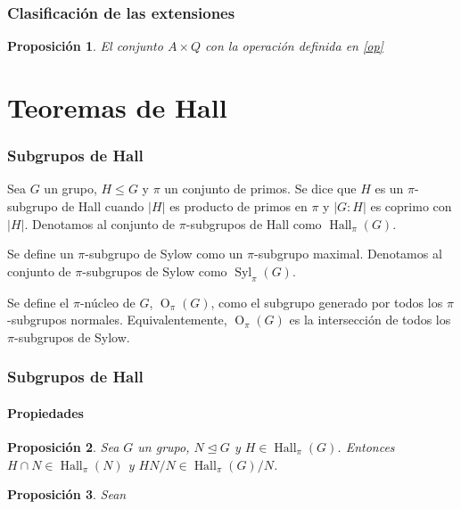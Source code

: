 \documentclass[
	11pt, %
]{beamer}
\DeclareMathOperator{\SylowSubgroup}{Syl}
\DeclareMathOperator{\HallSubgroup}{Hall}
\DeclareMathOperator{\OSubgroup}{O}
\newcommand{\Syl}[2]{\SylowSubgroup_{#1}(#2)}
\newcommand{\Hall}[2]{\HallSubgroup_{#1}(#2)}
\newcommand{\Core}[2]{\OSubgroup_{#1}(#2)}
\newcommand{\norm}{\trianglelefteq}
\newcommand{\ord}[1]{\left|#1\right|}%
\newtheorem{proposition}{Proposici\'on}
\begin{document}
\begin{frame}
	\frametitle{Clasificación de las extensiones}
	\begin{proposition}
		El conjunto $A\times Q$ con la operación definida en \eqref{op}
	\end{proposition}
	
	
\end{frame}



\section{Teoremas de Hall}

\begin{frame}
	\frametitle{Subgrupos de Hall}
	
	\begin{definition}
		Sea $G$ un grupo, $H\leq G$ y $\pi$ un conjunto de primos. Se dice que $H$ es un $\pi$-subgrupo de Hall cuando $\ord{H}$ es producto de primos en $\pi$ y $\ord{G:H}$ es coprimo con $\ord H$. Denotamos al conjunto de $\pi$-subgrupos de Hall como $\Hall \pi G$.
	\end{definition}
	\begin{definition}
		Se define un $\pi$-subgrupo de Sylow como un $\pi$-subgrupo maximal. Denotamos al conjunto de $\pi$-subgrupos de Sylow como $\Syl \pi G$.
	\end{definition}
	\smallskip %
	
	\begin{definition}
		Se define el $\pi$-núcleo de $G$, $\Core \pi G$, como el subgrupo generado por todos los $\pi$-subgrupos normales. Equivalentemente, $\Core \pi G$ es la intersección de todos los $\pi$-subgrupos de Sylow.
	\end{definition}
	
\end{frame}

\begin{frame}
	\frametitle{Subgrupos de Hall}
	\framesubtitle{Propiedades}

	\begin{proposition}
		Sea $G$ un grupo, $N\norm G$ y $H\in \Hall \pi G$. Entonces $H\cap N \in \Hall \pi {N}$ y $HN/N\in \Hall \pi G/N$.
	\end{proposition}
	
	\begin{proposition}
		Sean
	\end{proposition}
	
\end{frame}
\end{document}
